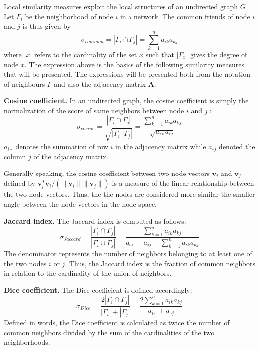 Local similarity measures exploit the local structures of an undirected graph $G$ \cite{fouss2016algorithms}. Let $\Gamma_i$ be the neighborhood of node $i$ in a network. The common friends of node $i$ and $j$ is thus given by
\begin{equation}
\label{common}
\sigma_{common} = |\Gamma_i \cap \Gamma_j| = \sum_{k=1}^n a_{ik}a_{kj}
\end{equation}
where $|x|$ refers to the cardinality of the set $x$ such that $|\Gamma_x |$ gives the degree of node $x$. The expression above is the basics of the following similarity measures that will be presented. The expressions will be presented both from the notation of neighbours $\Gamma$ and also the adjacency matrix $\textbf{A}$.

\textbf{Cosine coefficient.} In an undirected graph, the cosine coefficient is simply the normalization of the score of same neighbors between node $i$ and $j$ \cite{fouss2016algorithms}:
\begin{equation}
    \label{cosine}
    \sigma_{cosine} = \frac{|\Gamma_i \cap \Gamma_j|}{\sqrt{|\Gamma_i||\Gamma_j|}} = \frac{\sum_{k=1}^n a_{ik}a_{kj}}{\sqrt{a_{i \circ }a_{\circ j}}}
\end{equation}
$a_{i \circ }$ denotes the summation of row $i$ in the adjacency matrix while $a_{\circ j}$ denoted the column $j$ of the adjacency matrix.

Generally speaking, the cosine coefficient between two node vectors $\textbf{v}_i$ and $\textbf{v}_j$ defined by $\textbf{v}_i^T\textbf{v}_i/(\|\textbf{v}_i\|\|\textbf{v}_j\|)$ is a measure of the linear relationship between the two node vectors. Thus, the the nodes are considered more similar the smaller angle between the node vectors in the node space.

\textbf{Jaccard index.} The Jaccard index is computed as follows:
\begin{equation}
    \label{jaccard}
    \sigma_{Jaccard} = \frac{|\Gamma_i \cap \Gamma_j|}{|\Gamma_i \cup \Gamma_j|} = \frac{\sum_{k=1}^n a_{ik}a_{kj}}{a_{i \circ }+a_{\circ j}-\sum_{k=1}^n a_{ik}a_{kj}}
\end{equation}
The denominator represents the number of neighbors belonging to at least one of the two nodes $i$ or $j$. Thus, the Jaccard index is the fraction of common neighbors in relation to the cardinality of the union of neighbors. 

\textbf{Dice coefficient.} The Dice coefficient is defined accordingly:
\begin{equation}
    \label{dice}
    \sigma_{Dice} = \frac{2 |\Gamma_i \cap \Gamma_j|}{|\Gamma_i|+|\Gamma_j|}= \frac{2\sum_{k=1}^n a_{ik}a_{kj}}{a_{i \circ }+a_{\circ j}}
\end{equation}
Defined in words, the Dice coefficient is calculated as twice the number of common neighbors divided by the sum of the cardinalities of the two neighborhoods. 

